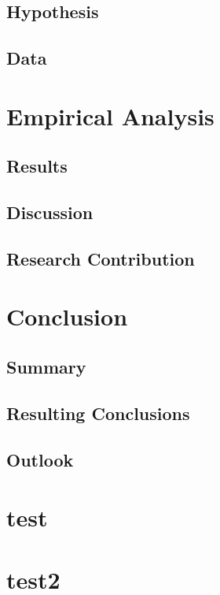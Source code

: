 \documentclass{seal_thesis}
\begin{document}
\section{Hypothesis}
\section{Data}

\chapter{Empirical Analysis}
\label{ch:empirical_analysis}



\section{Results}
\section{Discussion}
\section{Research Contribution}

\chapter{Conclusion}
\label{ch:conclusion}

\section{Summary}
\section{Resulting Conclusions}
\section{Outlook}

\appendix

\chapter{test}
\chapter{test2}

\backmatter




\end{document}

